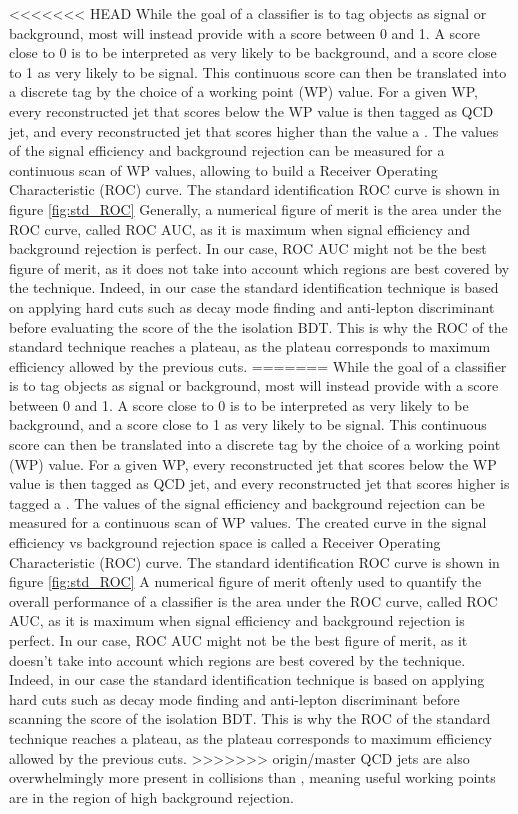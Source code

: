 <<<<<<< HEAD
While the goal of a classifier is to tag objects as signal or background, most will instead provide with a score between 0 and 1. A score close to 0 is to be interpreted as very likely to be background, and a score close to 1 as very likely to be signal. This continuous score can then be translated into a discrete tag by the choice of a working point (WP) value. For a given WP, every reconstructed jet that scores below the WP value is then tagged as QCD jet, and every reconstructed jet that scores higher than the value a \tauh. The values of the signal efficiency and background rejection can be measured for a continuous scan of WP values, allowing to build a Receiver Operating Characteristic (ROC) curve. The standard identification ROC curve is shown in figure \ref{fig:std_ROC}
Generally, a numerical figure of merit is the area under the ROC curve, called ROC AUC, as it is maximum when signal efficiency and background rejection is perfect.
In our case, ROC AUC might not be the best figure of merit, as it does not take into account which regions are best covered by the technique. Indeed, in our case the standard identification technique is based on applying hard cuts such as decay mode finding and anti-lepton discriminant before evaluating the score of the the isolation BDT. This is why the ROC of the standard technique reaches a plateau, as the plateau corresponds to maximum efficiency allowed by the previous cuts.
=======
While the goal of a classifier is to tag objects as signal or background, most will instead provide with a score between 0 and 1. A score close to 0 is to be interpreted as very likely to be background, and a score close to 1 as very likely to be signal. This continuous score can then be translated into a discrete tag by the choice of a working point (WP) value. For a given WP, every reconstructed jet that scores below the WP value is then tagged as QCD jet, and every reconstructed jet that scores higher is tagged a \tauh. The values of the signal efficiency and background rejection can be measured for a continuous scan of WP values. The created curve in the signal efficiency vs background rejection space is called a Receiver Operating Characteristic (ROC) curve. The standard identification ROC curve is shown in figure \ref{fig:std_ROC}
A numerical figure of merit oftenly used to quantify the overall performance of a classifier is the area under the ROC curve, called ROC AUC, as it is maximum when signal efficiency and background rejection is perfect.
In our case, ROC AUC might not be the best figure of merit, as it doesn't take into account which regions are best covered by the technique. Indeed, in our case the standard identification technique is based on applying hard cuts such as decay mode finding and anti-lepton discriminant before scanning the score of the isolation BDT. This is why the ROC of the standard technique reaches a plateau, as the plateau corresponds to maximum efficiency allowed by the previous cuts.
>>>>>>> origin/master
QCD jets are also overwhelmingly more present in collisions than \tauh, meaning useful working points are in the region of high background rejection. 

